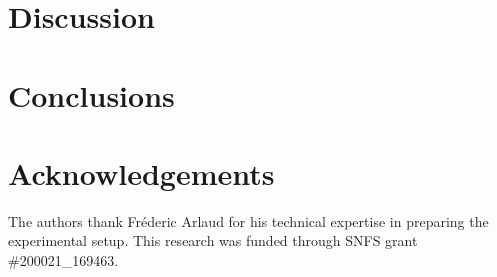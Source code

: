\documentclass[authoryear,preprint,review,12pt]{elsarticle}
\begin{document}
\section{Discussion}
\label{sec:dis}

\section{Conclusions}
\label{sec:conc}

\section*{Acknowledgements}
\label{sec:acknow}

The authors thank Fr{\'e}deric Arlaud for his technical expertise in preparing the experimental setup. This research was funded through SNFS grant \#200021\_169463.


%
% 






\end{document}
